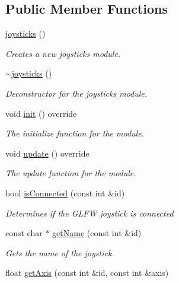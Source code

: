 \subsection*{Public Member Functions}
\begin{DoxyCompactItemize}
\item 
\hyperlink{classflounder_1_1joysticks_ad0676c90afa28b4fb69de64c253e9c34}{joysticks} ()
\begin{DoxyCompactList}\small\item\em Creates a new joysticks module. \end{DoxyCompactList}\item 
\hyperlink{classflounder_1_1joysticks_aaab9cf61c7c5d6736742347c7c657ed8}{$\sim$joysticks} ()
\begin{DoxyCompactList}\small\item\em Deconstructor for the joysticks module. \end{DoxyCompactList}\item 
void \hyperlink{classflounder_1_1joysticks_a6bb77cff38ccbdcdde66495afc538b1a}{init} () override
\begin{DoxyCompactList}\small\item\em The initialize function for the module. \end{DoxyCompactList}\item 
void \hyperlink{classflounder_1_1joysticks_a346fc03cae7164d6eb927333d1ae725f}{update} () override
\begin{DoxyCompactList}\small\item\em The update function for the module. \end{DoxyCompactList}\item 
bool \hyperlink{classflounder_1_1joysticks_a5474ad44039f8b1bdcd73a268d09e7f2}{is\+Connected} (const int \&id)
\begin{DoxyCompactList}\small\item\em Determines if the G\+L\+FW joystick is connected \end{DoxyCompactList}\item 
const char $\ast$ \hyperlink{classflounder_1_1joysticks_ae471533fed9714160b5af9e22b00c427}{get\+Name} (const int \&id)
\begin{DoxyCompactList}\small\item\em Gets the name of the joystick. \end{DoxyCompactList}\item 
float \hyperlink{classflounder_1_1joysticks_a67c5fd2f77004c37cf1720c985c9d6f9}{get\+Axis} (const int \&id, const int \&axis)

\end{DoxyCompactItemize}
